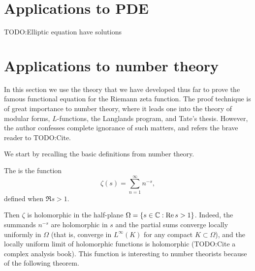 \section{Applications to PDE}
TODO:\@ Elliptic equation have solutions

\section{Applications to number theory}
In this section we use the theory that we have developed thus far to prove the famous functional equation for the Riemann zeta function.
The proof technique is of great importance to number theory, where it leads one into the theory of modular forms, $L$-functions, the Langlands program, and Tate's thesis.
However, the author confesses complete ignorance of such matters, and refers the brave reader to TODO:Cite.

We start by recalling the basic definitions from number theory.
\begin{definition}
The  is the function
\[\zeta(s) = \sum_{n=1}^{\infty} n^{-s},\]
defined when $\Re s > 1$.
\end{definition}
Then $\zeta$ is holomorphic in the half-plane $\Omega = \{s \in \mathbb{C}: \operatorname{Re} s > 1\}$.
Indeed, the summands $n^{-s}$ are holomorphic in $s$ and the partial sums converge locally uniformly in $\Omega$ (that is, converge in $L^{\infty}(K)$ for any compact $K \subset \Omega$), and the locally uniform limit of holomorphic functions is holomorphic (TODO:Cite a complex analysis book).
This function is interesting to number theorists because of the following theorem.

